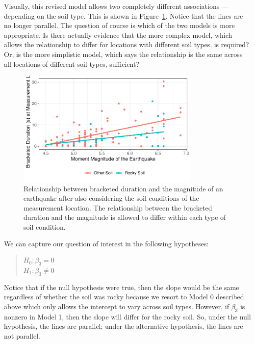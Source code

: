 \documentclass[
  letterpaper,
  DIV=11,
  numbers=noendperiod]{scrreprt}
\theoremstyle{plain}
\theoremstyle{definition}
\theoremstyle{definition}
\theoremstyle{remark}
\begin{document}
Visually, this revised model allows two completely different
associations --- depending on the soil type. This is shown in
Figure~\ref{fig-regextensions-int-plot}. Notice that the lines are no
longer parallel. The question of course is which of the two models is
more appropriate. Is there actually evidence that the more complex
model, which allows the relationship to differ for locations with
different soil types, is required? Or, is the more simplistic model,
which says the relationship is the same across all locations of
different soil types, sufficient?

\begin{figure}

{\centering \includegraphics[width=0.8\textwidth,height=\textheight]{./images/fig-regextensions-int-plot-1.pdf}

}

\caption{\label{fig-regextensions-int-plot}Relationship between
bracketed duration and the magnitude of an earthquake after also
considering the soil conditions of the measurement location. The
relationship between the bracketed duration and the magnitude is allowed
to differ within each type of soil condition.}

\end{figure}

We can capture our question of interest in the following hypotheses:

\begin{quote}
\(H_0: \beta_3 = 0\)\\
\(H_1: \beta_3 \neq 0\)
\end{quote}

Notice that if the null hypothesis were true, then the slope would be
the same regardless of whether the soil was rocky because we resort to
Model 0 described above which only allows the intercept to vary across
soil types. However, if \(\beta_3\) is nonzero in Model 1, then the
slope will differ for the rocky soil. So, under the null hypothesis, the
lines are parallel; under the alternative hypothesis, the lines are not
parallel.
\end{document}

